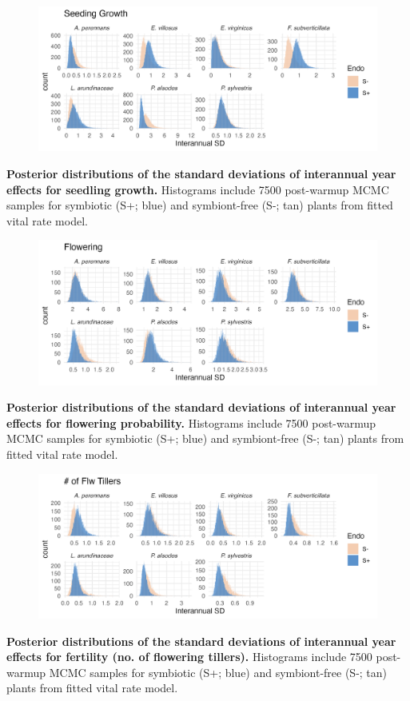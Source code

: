 \documentclass[12pt]{article}
\begin{document}
\begin{figure}[H]
	\centering
	\includegraphics[width=.9\linewidth]{seedgrow_sigmayear_hist.png}
\end{figure}
 \textbf{Posterior distributions of the standard deviations of interannual year effects for seedling growth.} Histograms include 7500 post-warmup MCMC samples for symbiotic (S+; blue) and symbiont-free (S-; tan) plants from fitted vital rate model.
\newpage

\begin{figure}[H]
	\centering
	\includegraphics[width=.9\linewidth]{flow_sigmayear_hist.png}
\end{figure}
 \textbf{Posterior distributions of the standard deviations of interannual year effects for flowering probability.} Histograms include 7500 post-warmup MCMC samples for symbiotic (S+; blue) and symbiont-free (S-; tan) plants from fitted vital rate model.


\begin{figure}[H]
	\centering
	\includegraphics[width=.9\linewidth]{fert_sigmayear_hist.png}
\end{figure}
 \textbf{Posterior distributions of the standard deviations of interannual year effects for fertility (no. of flowering tillers).} Histograms include 7500 post-warmup MCMC samples for symbiotic (S+; blue) and symbiont-free (S-; tan) plants from fitted vital rate model.
\newpage
\end{document}
